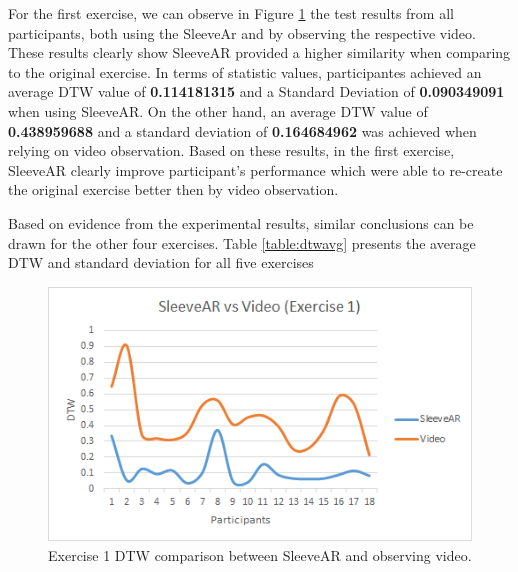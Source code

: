 For the first exercise, we can observe in Figure \ref{fig:sleevearVSvideoEx1} the test results from all participants, both using the SleeveAr and by observing the respective video.
These results clearly show SleeveAR provided a higher similarity when comparing to the original exercise. 
In terms of statistic values, participantes achieved an average \ac{DTW} value of \textbf{0.114181315} and a Standard Deviation of \textbf{0.090349091} when using SleeveAR.
On the other hand, an average \ac{DTW} value of \textbf{0.438959688} and a standard deviation of \textbf{0.164684962} was achieved when relying on video observation. 
Based on these results, in the first exercise, SleeveAR clearly improve participant's performance which were able to re-create the original exercise better then by video observation. 

Based on evidence from the experimental results, similar conclusions can be drawn for the other four exercises. Table \ref{table:dtwavg} presents the average DTW and standard deviation for all five exercises 

\begin{figure}[t!]
    \centering
    \includegraphics{imgs/results/sleevearVSvideoEx1.png}
    \caption{Exercise 1 DTW comparison between SleeveAR and observing video.}
    \label{fig:sleevearVSvideoEx1}
\end{figure}



